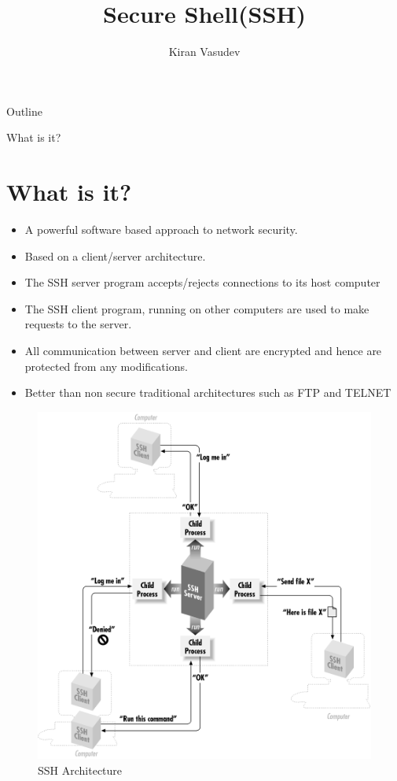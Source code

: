 \documentclass{beamer}
\title{Secure Shell(SSH)}
\author{Kiran Vasudev\inst{1}}
\institute[]
{
	\inst{1}
	Hochschule Bonn-Rhein-Sieg
	
}
\begin{document}
	
	\begin{frame}
	\titlepage
\end{frame}

\begin{frame}{Outline}
\tableofcontents
\end{frame}

\begin{frame}[allowframebreaks]{What is it?}
\section{What is it?}

	\begin{itemize}
		\item {
			A powerful software based approach to network security.
		}
		\item {
			Based on a client/server architecture.
		}
		\item{The SSH server program accepts/rejects connections to its host computer}
		
		\item{
			The SSH client program, running on other computers are used to make requests to the server.
		}
		\item{
			All communication between server and client are encrypted and hence are protected from any modifications.
		}
		\item{Better than non secure traditional architectures such as FTP and TELNET}
		
	\end{itemize}
	\begin{figure}
		\includegraphics[scale=0.4]{images/arch}
		\caption{SSH Architecture\cite{arch}}
	\end{figure}
	


\end{frame}
\end{document}
